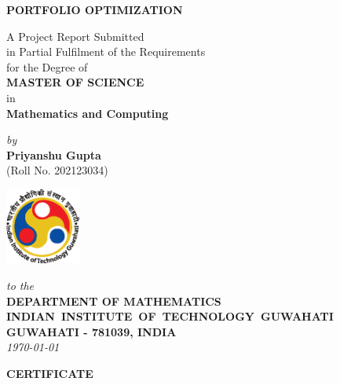 \documentclass[12pt,a4wide]{report}
\theoremstyle{plain}
\theoremstyle{definition}
\theoremstyle{remark}
\begin{document}

\begin{titlepage}
\enlargethispage{3cm}

\begin{center}

\vspace*{-2cm}

\textbf{\Large PORTFOLIO OPTIMIZATION}

\vfill

 A Project Report Submitted \\
 in Partial Fulfilment of the Requirements  \\
  for the Degree of  \\[10pt]

 {\Large \bf MASTER OF SCIENCE}\\[5pt]
 in \\
 {\large \bf Mathematics and Computing}

 \vfill

{\large \emph{by}}\\[5pt]
{\large\bf {Priyanshu Gupta}}\\[5pt]
{\large (Roll No. 202123034)}

\vfill
\includegraphics[height=2.5cm]{iitglogo.eps}

\vspace*{0.5cm}

{\em\large to the}\\[10pt]
{\bf\large DEPARTMENT OF MATHEMATICS} \\[5pt]
{\bf\large \mbox{INDIAN INSTITUTE OF TECHNOLOGY GUWAHATI}}\\[5pt]
{\bf\large GUWAHATI - 781039, INDIA}\\[10pt]
{\it\large \mydate\today}
\end{center}

\end{titlepage}

\clearpage

 \setcounter{page}{2}
\begin{center}
{\Large{\bf{CERTIFICATE}}}
\end{center}
\end{document}
